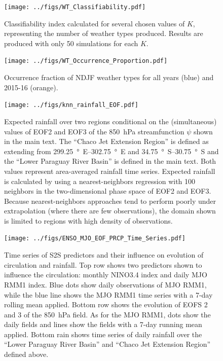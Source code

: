 \documentclass{article}
\begin{document}
\begin{figure}
  \texttt{[image: ../figs/WT\_Classifiability.pdf]}
	\caption{
		Classifiability index \citep[see Methods and][]{Michelangeli1995} calculated for several chosen values of $K$, representing the number of weather types produced.
		Results are produced with only 50 simulations for each $K$.
	}
\end{figure}

\begin{figure}
  \texttt{[image: ../figs/WT\_Occurrence\_Proportion.pdf]}
	\caption{
		Occurrence fraction of NDJF weather types for all years (blue) and 2015-16 (orange).
	}
\end{figure}

\begin{figure}
  \texttt{[image: ../figs/knn\_rainfall\_EOF.pdf]}
	\caption{
    Expected rainfall over two regions conditional on the (simultaneous) values of EOF2 and EOF3 of the \SI{850}{\hecto\pascal} streamfunction $\psi$ shown in the main text.
    The ``Chaco Jet Extension Region'' is defined as extending from \SIrange{299.25}{302.75}{\degree E} and \SIrange{34.75}{30.75}{\degree S} and the ``Lower Paraguay River Basin'' is defined in the main text.
    Both values represent area-averaged rainfall time series.
    Expected rainfall is calculated by using a nearest-neighbors regression with 100 neighbors in the two-dimensional phase space of EOF2 and EOF3.
    Because nearest-neighbors approaches tend to perform poorly under extrapolation (where there are few observations), the domain shown is limited to regions with high density of observations.
  }
\end{figure}

\begin{figure}
  \texttt{[image: ../figs/ENSO\_MJO\_EOF\_PRCP\_Time\_Series.pdf]}
	\caption{
		Time series of S2S predictors and their influence on evolution of circulation and rainfall.
    Top row shows two predictors shown to influence the circulation: monthly NINO3.4 index and daily MJO RMM1 index.
    Blue dots show daily observations of MJO RMM1, while the blue line shows the MJO RMM1 time series with a 7-day rolling mean applied.
    Bottom row shows the evolution of EOFS 2 and 3 of the \SI{850}{\hecto\pascal} field.
    As for the MJO RMM1, dots show the daily fields and lines show the fields with a 7-day running mean applied.
    Bottom rain shows time series of daily rainfall over the ``Lower Paraguay River Basin'' and ``Chaco Jet Extension Region'' defined above.
	}
\end{figure}

\clearpage


\end{document}
